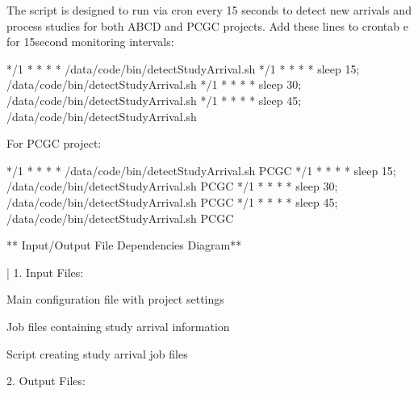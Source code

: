 \documentclass[letterpaper,10pt,english]{sphinxmanual}
\begin{document}
\sphinxAtStartPar
{}

\sphinxAtStartPar
The script is designed to run via cron every 15 seconds to detect new arrivals and process studies for both ABCD and PCGC projects.
Add these lines to crontab \sphinxhyphen{}e for 15\sphinxhyphen{}second monitoring intervals:

\begin{sphinxVerbatim}[commandchars=\\\{\}]
*/1 * * * * /data/code/bin/detectStudyArrival.sh
*/1 * * * * sleep 15; /data/code/bin/detectStudyArrival.sh
*/1 * * * * sleep 30; /data/code/bin/detectStudyArrival.sh
*/1 * * * * sleep 45; /data/code/bin/detectStudyArrival.sh
\end{sphinxVerbatim}

\sphinxAtStartPar
For PCGC project:

\begin{sphinxVerbatim}[commandchars=\\\{\}]
*/1 * * * * /data/code/bin/detectStudyArrival.sh PCGC
*/1 * * * * sleep 15; /data/code/bin/detectStudyArrival.sh PCGC
*/1 * * * * sleep 30; /data/code/bin/detectStudyArrival.sh PCGC
*/1 * * * * sleep 45; /data/code/bin/detectStudyArrival.sh PCGC
\end{sphinxVerbatim}

\sphinxAtStartPar
** Input/Output File Dependencies Diagram**


\sphinxAtStartPar
{}
| 1. Input Files:

\begin{DUlineblock}{0em}
\item[] \sphinxhyphen{}  \sphinxhyphen{} Main configuration file with project settings
\item[] \sphinxhyphen{}  \sphinxhyphen{} Job files containing study arrival information
\item[] \sphinxhyphen{}  \sphinxhyphen{} Script creating study arrival job files
\end{DUlineblock}

\begin{DUlineblock}{0em}
\item[] 2. Output Files:
\end{DUlineblock}
\end{document}
